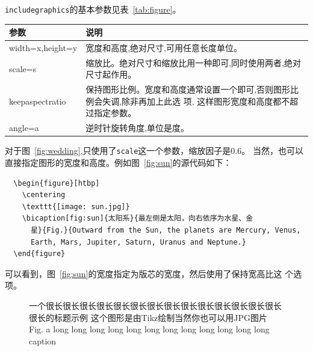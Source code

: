 \texttt{includegraphics}的基本参数见表~\ref{tab:figure}。

\begin{table}[htbp]
  \centering
  \vspace{0.2cm}
  \wuhao
  \begin{tabularx}{0.8\textwidth{}}{lX}
    \toprule
    参数             & 说明                                                             \\
    \midrule
    width=x,height=y & 宽度和高度,绝对尺寸,可用任意长度单位。                           \\
    scale=s          & 缩放比。绝对尺寸和缩放比用一种即可,同时使用两者,绝对尺寸起作用。 \\
    keepaspectratio  & 保持图形比例。宽度和高度通常设置一个即可,否则图形比
    例会失调,除非再加上此选 项,
    这样图形宽度和高度都不超过指定参数。                                                \\
    angle=a          & 逆时针旋转角度,单位是度。                                        \\
    \bottomrule
  \end{tabularx}
\end{table}

对于图~\ref{fig:wedding},只使用了\texttt{scale}这一个参数，缩放因子是0.6。
当然，也可以直接指定图形的宽度和高度。例如图~\ref{fig:sun}的源代码如下：

\begin{lstlisting}
  \begin{figure}[htbp]
    \centering
    \texttt{[image: sun.jpg]}
    \bicaption[fig:sun]{太阳系}{最左侧是太阳，向右依序为水星、金
      星}{Fig.}{Outward from the Sun, the planets are Mercury, Venus,
      Earth, Mars, Jupiter, Saturn, Uranus and Neptune.}
  \end{figure}
\end{lstlisting}

可以看到，图~\ref{fig:sun}的宽度指定为版芯的宽度，然后使用了保持宽高比这
个选项。

\begin{figure}[tbph]
  \usetikzlibrary{calc,through}
  \centering
  {一个很长很长很长很长很长很长很长很长很长很长很长很长很长很长很长的标题示例
    这个图形是由Tikz绘制当然你也可以用JPG图片}
  {Fig.}
  {a long long long long long long long long long long long long caption}
\end{figure}

